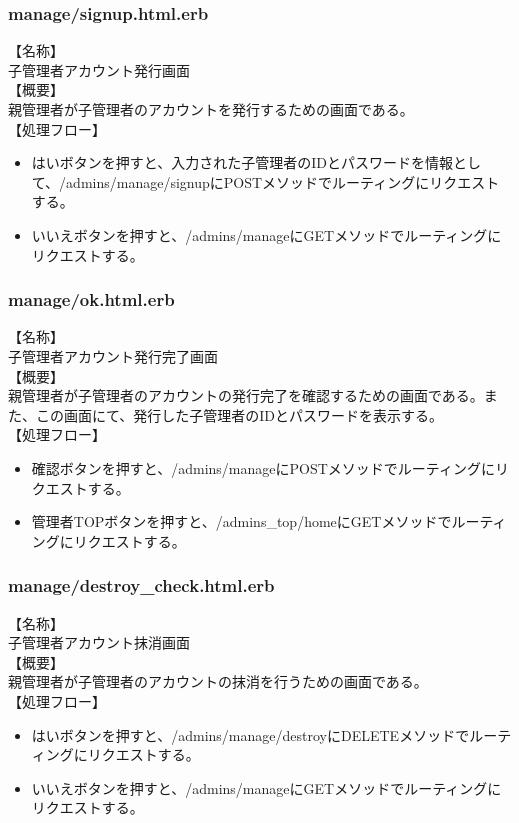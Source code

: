 \documentclass[a4j]{jarticle}
\begin{document}
\subsubsection{manage/signup.html.erb}
\noindent
【名称】\\
子管理者アカウント発行画面\\
【概要】\\
親管理者が子管理者のアカウントを発行するための画面である。\\
【処理フロー】
\begin{itemize}
  \item はいボタンを押すと、入力された子管理者のIDとパスワードを情報として、/admins/manage/signupにPOSTメソッドでルーティングにリクエストする。
  \item いいえボタンを押すと、/admins/manageにGETメソッドでルーティングにリクエストする。
\end{itemize}

\subsubsection{manage/ok.html.erb}
\noindent
【名称】\\
子管理者アカウント発行完了画面\\
【概要】\\
親管理者が子管理者のアカウントの発行完了を確認するための画面である。また、この画面にて、発行した子管理者のIDとパスワードを表示する。\\
【処理フロー】
\begin{itemize}
  \item 確認ボタンを押すと、/admins/manageにPOSTメソッドでルーティングにリクエストする。
  \item 管理者TOPボタンを押すと、/admins\_top/homeにGETメソッドでルーティングにリクエストする。
\end{itemize}

\subsubsection{manage/destroy\_check.html.erb}
\noindent
【名称】\\
子管理者アカウント抹消画面\\
【概要】\\
親管理者が子管理者のアカウントの抹消を行うための画面である。\\
【処理フロー】
\begin{itemize}
  \item はいボタンを押すと、/admins/manage/destroyにDELETEメソッドでルーティングにリクエストする。
  \item いいえボタンを押すと、/admins/manageにGETメソッドでルーティングにリクエストする。
\end{itemize}
\end{document}
